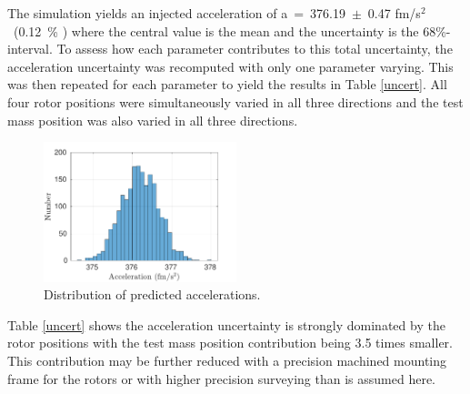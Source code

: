 \documentclass[superscriptaddress, twocolumn, prd]{revtex4-1}
\begin{document}
The simulation yields an injected acceleration of a~=~376.19~$\pm$~0.47 fm/s$^2$~(0.12~\% ) where the central value is the mean and the uncertainty is the 68\%-interval. To assess how each parameter contributes to this total uncertainty, the acceleration uncertainty was recomputed with only one parameter varying. This was then repeated for each parameter to yield the results in Table \ref{uncert}. All four rotor positions were simultaneously varied  in all three directions and the test mass position was also varied in all three directions.

\begin{figure}[!h]
\centering \includegraphics[width=0.5\textwidth]{Super4_Dist.pdf}
\caption{Distribution of predicted accelerations.}
\label{dist} 
\end{figure}


Table \ref{uncert} shows the acceleration uncertainty is strongly dominated by the rotor positions with the test mass position contribution being 3.5 times smaller. This contribution may be further reduced with a precision machined mounting frame for the rotors or with higher precision surveying than is assumed here.
\end{document}
